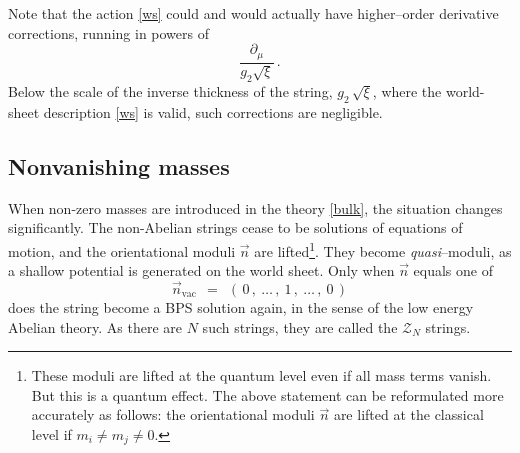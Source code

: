 \documentclass[12pt]{article}
\def\beq{\begin{equation}}
\def\eeq{\end{equation}}
\newcommand{\p}{\partial}
\newcommand{\mc}[1]{\mathcal{#1}}
\newcommand{\nvac}{\vec{n}{}_\text{vac}}
\begin{document}
	Note that the action \eqref{ws} could and would actually have higher--order derivative corrections, running in powers of
\beq
\label{higher}
	\frac{\p_\mu}{g_2\sqrt{\xi}}\,.
\eeq
	Below the scale of the inverse thickness of the string, $ g_2\,\sqrt{\xi} $, where the world-sheet
	description \eqref{ws} is valid, such corrections are negligible.


\subsection{Nonvanishing masses}

	When non-zero masses are introduced in the theory \eqref{bulk}, the situation changes significantly.
	The non-Abelian strings cease to be solutions of equations of motion, 
	and the orientational moduli $ \vec{n} $ are lifted\footnote{These moduli are lifted at the quantum level even if all mass terms vanish. 
	But this is a quantum effect.
	The above statement can be reformulated more accurately as follows: 
	the orientational moduli $ \vec{n} $ are lifted at the classical level if $m_i\neq m_j\neq 0$.}.
	They become {\it quasi}--moduli, as a shallow potential is generated on the world sheet.
	Only when $ \vec{n} $ equals one of 
\beq
\label{nvac}
	\nvac    ~~=~~    (\, 0\,,~ \dots\,,~1\,,~ \dots\,,~ 0 \,)
\eeq
	does the string become a BPS solution again, in the sense of the low energy Abelian theory.
	As there are $ N $ such strings, they are called the $ \mc{Z}_N $ strings.
\end{document}

